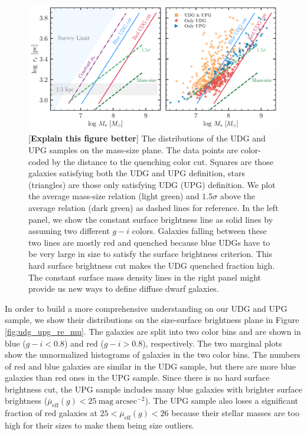 \documentclass[twocolumn,astrosymb,twocolappendix]{aastex631}
\newcommand{\sbunit}{\mathrm{mag\ arcsec}^{-2}}
\newcommand{\sbeff}{\overline{\mu}_{\mathrm{eff}}(g)}
\begin{document}
\begin{CJK*}{UTF8}{gbsn}
\begin{figure}
	\vbox{ 
		\centering
		\includegraphics[width=1\linewidth]{mass_size_plane_new.pdf}
	}
    \caption{[\textbf{Explain this figure better}] The distributions of the UDG and UPG samples on the mass-size plane. The data points are color-coded by the distance to the quenching color cut. Squares are those galaxies satisfying both the UDG and UPG definition, stars (triangles) are those only satisfying UDG (UPG) definition.
    We plot the average mass-size relation (light green) and $1.5\sigma$ above the average relation (dark green) as dashed lines for reference. In the left panel, we show the constant surface brightness line as solid lines by assuming two different $g-i$ colors. Galaxies falling between these two lines are mostly red and quenched because blue UDGs have to be very large in size to satisfy the surface brightness criterion. This hard surface brightness cut makes the UDG quenched fraction high. The constant surface mass density lines in the right panel might provide us new ways to define diffuse dwarf galaxies.
    }
    \label{fig:mass_size}
\end{figure}

In order to build a more comprehensive understanding on our UDG and UPG sample, we show their distributions on the size-surface brightness plane in Figure \ref{fig:udg_upg_re_mu}. The galaxies are split into two color bins and are shown in blue ($g-i < 0.8$) and red ($g-i > 0.8$), respectively. The two marginal plots show the unnormalized histograms of galaxies in the two color bins. The numbers of red and blue galaxies are similar in the UDG sample, but there are more blue galaxies than red ones in the UPG sample. Since there is no hard surface brightness cut, the UPG sample includes many blue galaxies with brighter surface brightness ($\sbeff < 25\ \sbunit$). The UPG sample also loses a significant fraction of red galaxies at $25 < \sbeff < 26$ because their stellar masses are too high for their sizes to make them being size outliers. 


\end{CJK*}
\end{document}

